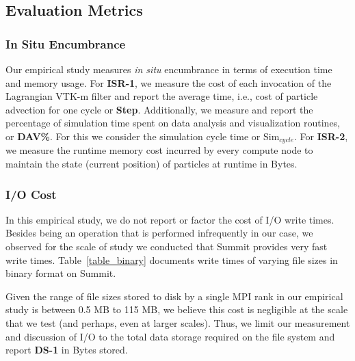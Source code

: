 %
%
%

\subsection{Evaluation Metrics}
\label{sec:metrics}

\subsubsection{In Situ Encumbrance}
\label{sec:encumbrance}
%
Our empirical study measures \textit{in situ} encumbrance in terms of execution time and memory usage.
%
For \textbf{ISR-1}, we measure the cost of each invocation of the Lagrangian VTK-m filter and report the average time, i.e., cost of particle advection for one cycle or \textbf{Step}.
Additionally, we measure and report the percentage of simulation time spent on data analysis and visualization routines, or \textbf{DAV\%}.
%
For this we consider the simulation cycle time or Sim$_{cycle}$.
For \textbf{ISR-2}, we measure the runtime memory cost incurred by every compute node to maintain the state (current position) of particles at runtime in Bytes.


\subsubsection{I/O Cost}
\label{sec:iocost}
In this empirical study, we do not report or factor the cost of I/O write times. 
%
Besides being an operation that is performed infrequently in our case, 
we observed for the scale of study we conducted that Summit provides very 
fast write times.
%
Table~\ref{table_binary} documents write times of varying file sizes in binary format on Summit.
%

Given the range of file sizes stored to disk by a single MPI rank in our empirical study is between 0.5 MB to 115 MB, we believe this cost is negligible at the scale that we test (and perhaps, even at larger scales).
%
Thus, we limit our measurement and discussion of I/O to the total data storage required on the file system and report \textbf{DS-1} in Bytes stored.

%

